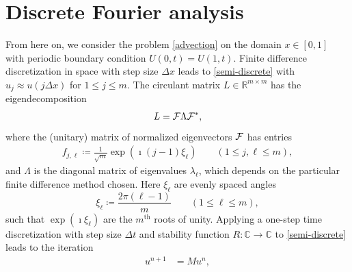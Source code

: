 \documentclass[a4paper]{article}
\newcommand{\dt}{\Delta t}
\newcommand{\dx}{\Delta x}
\newcommand{\cF}{{\cal{F}}}
\begin{document}




\section{Discrete Fourier analysis}\label{sectiondiscFourier}
From here on, we consider the problem \eqref{advection} on the domain $x\in[0,1]$
with periodic boundary condition $U(0,t)=U(1,t)$.  Finite difference discretization
in space with step size $\dx$ leads to \eqref{semi-discrete} with $u_j\approx u(j\dx)$ for $1\le j\le m$. 
The circulant matrix $L\in\mathbb{R}^{m\times m}$ has the eigendecomposition \cite[Appendix C]{rjl:fdmbook}
\begin{align}\label{eigen}
    L  = \cF \Lambda \cF^*,
\end{align}
where the (unitary) matrix of normalized eigenvectors $\cF$ has entries
\begin{align}\label{eigenvectrors}
    f_{j,\ell}  \coloneqq \frac{1}{\sqrt{m}}\exp(\imath  (j-1) \xi_\ell)  \quad\quad (1 \le j, \ell \le m),
\end{align}
and $\Lambda$ is the diagonal matrix of eigenvalues $\lambda_\ell$, which depends on the
particular finite difference method chosen.  Here $\xi_\ell$ are evenly spaced angles 
\begin{equation}\label{xildef}
    \xi_\ell  \coloneqq \frac{2\pi(\ell-1)}{m} \quad\quad (1 \le \ell \le m),
\end{equation}
such that $\exp(\imath\xi_\ell)$ are the $m^\text{th}$ roots of unity.
Applying a one-step time
discretization with step size $\dt$ and stability function $R:\mathbb{C}\to\mathbb{C}$ to \eqref{semi-discrete} leads to
the iteration
\begin{align}\label{M}
    u^{n+1} & = M u^n,
\end{align}
\end{document}
